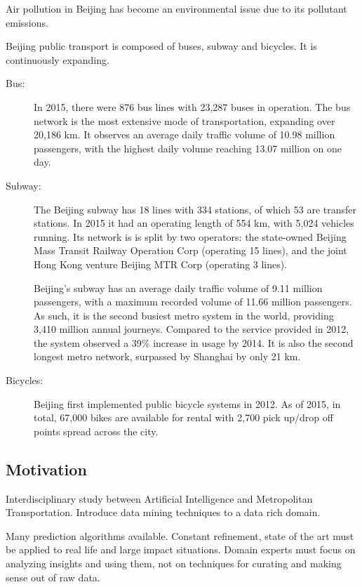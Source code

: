 \documentclass{article}
\begin{document}
Air pollution in Beijing has become an environmental issue due to its pollutant emissions. \cite{zhang2016air}

Beijing public transport is composed of buses, subway and bicycles. It is continuously expanding. 

\begin{description}
\item[Bus:] In 2015, there were 876 bus lines with 23,287 buses in operation. The bus network is the most extensive mode of transportation, expanding over 20,186 km. It observes an average daily traffic volume of 10.98 million passengers, with the highest daily volume reaching 13.07 million on one day. \cite{beijing2016annual}

\item[Subway:] The Beijing subway has 18 lines with 334 stations, of which 53 are transfer stations. In 2015 it had an operating length of 554 km, with 5,024 vehicles running. \cite{beijing2016annual} Its network is is split by two operators: the state-owned Beijing Mass Transit Railway Operation Corp (operating 15 lines), and the joint Hong Kong venture Beijing MTR Corp (operating 3 lines).

Beijing's subway has an average daily traffic volume of 9.11 million passengers, with a maximum recorded volume of 11.66 million passengers. As such, it is the second busiest metro system in the world, providing 3,410 million annual journeys. Compared to the service provided in 2012, the system observed a 39\% increase in usage by 2014. It is also the second longest metro network, surpassed by Shanghai by only 21 km.  \cite{uitp2015world} 

\item[Bicycles:] Beijing first implemented public bicycle systems in 2012. As of 2015, in total, 67,000 bikes are available for rental with 2,700 pick up/drop off points spread across the city. \cite{beijing2016annual}
\end{description}

\subsection{Motivation}
Interdisciplinary study between Artificial Intelligence and Metropolitan Transportation. Introduce data mining techniques to a data rich domain. 

Many prediction algorithms available. Constant refinement, state of the art must be applied to real life and large impact situations. Domain experts must focus on analyzing insights and using them, not on techniques for curating and making sense out of raw data. 
\end{document}
